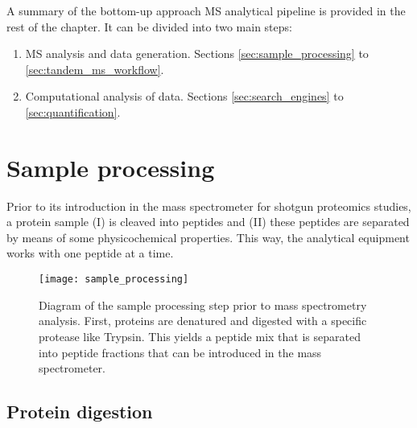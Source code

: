 A summary of the bottom-up approach MS analytical pipeline is provided in the rest of the chapter. It can be divided into two main steps:

\begin{enumerate}

\item \ac{MS} analysis and data generation. Sections \ref{sec:sample_processing} to \ref{sec:tandem_ms_workflow}.

\item Computational analysis of data. Sections \ref{sec:search_engines} to \ref{sec:quantification}.

\end{enumerate}

\section{Sample processing}

Prior to its introduction in the mass spectrometer for shotgun proteomics studies, a protein sample (I) is cleaved into peptides and (II) these peptides are separated by means of some physicochemical properties. This way, the analytical equipment works with one peptide at a time.

\label{sec:sample_processing}

\begin{figure}[!h]
\texttt{[image: sample\_processing]}
\caption[Sample processing summary]{Diagram of the sample processing step prior to mass spectrometry analysis. First, proteins are denatured and digested with a specific protease like Trypsin. This yields a peptide mix that is separated into peptide fractions that can be introduced in the mass spectrometer.}
\label{fig:sample_processing}
\end{figure}

\subsection{Protein digestion}
\label{subsec:protein_digestion}

